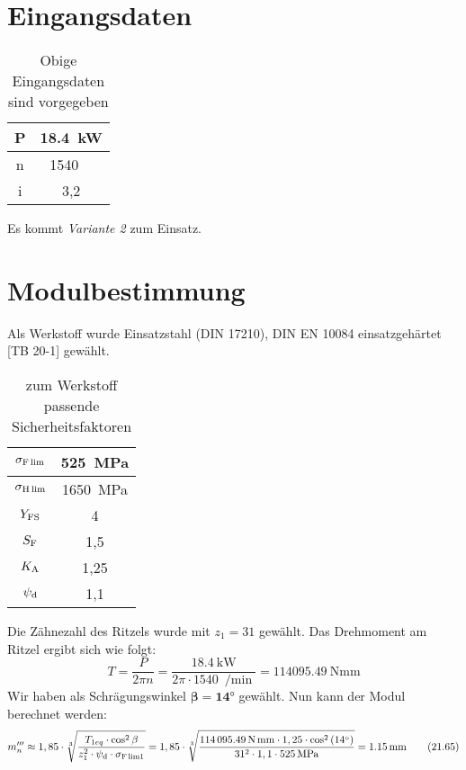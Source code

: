 \documentclass[15pt,a4paper]{article}
\begin{document}
	\tableofcontents
	\newpage
	\section{Eingangsdaten}
	\begin{table}[!hbpt]
		\centering
		\begin{tabular}{c|c}
			P & \SI{18,4}{\kilo\W}\\\hline
			n & \SI[per-mode=reciprocal]{1540}{\per \min}\\\hline
			i & 3,2
		\end{tabular}
		\caption{Obige Eingangsdaten sind vorgegeben}
		\label{Eingangsdaten}
	\end{table}
	\begin{center}
		Es kommt \textit{Variante 2} zum Einsatz.
	\end{center}
	\section{Modulbestimmung}
	Als Werkstoff wurde Einsatzstahl (DIN 17210), DIN EN 10084 einsatzgehärtet [TB 20-1] gewählt.
		\begin{table}[!hbpt]
		\centering
		\begin{tabular}{c|c}
			$\sigma_{\rm F\, lim}$ & \SI{525}{\mega\pascal}\\\hline
			$\sigma_{\rm H\, lim}$ & \SI{1650}{\mega\pascal}\\\hline
			$Y_{\rm FS}$ & 4 \\\hline
			$S_{\rm F}$ &  1,5 \\\hline
			$K_{\rm A}$ & 1,25 \\\hline
			$\psi_{\rm d}$ & 1,1
		\end{tabular}
		\caption{zum Werkstoff passende Sicherheitsfaktoren}
		\label{Sicherheit}
	\end{table}
	Die Zähnezahl des Ritzels wurde mit $z_1 = 31$ gewählt. Das Drehmoment am Ritzel ergibt sich wie folgt:
	$$T=\frac{P}{2\pi n}= \frac{\SI{18,4}{\kilo\watt}}{2\pi \cdot\SI{1540}{\per\min}}= \SI{114095,49}{\newton\milli\metre} $$
	Wir haben als Schrägungswinkel $\pmb{\beta = \ang{14}}$ gewählt.
	Nun kann der Modul berechnet werden:
	\begin{align}
			m'''_n \approx 1,85\cdot \sqrt[3]{\frac{T_{1 eq} \cdot \cos^2 \beta}{z_1^2 \cdot \psi_{\rm d}\cdot\sigma_{\rm F\, lim 1}}} =  
			1,85 \cdot \sqrt[3]{\frac{\SI{114095,49}{\newton\milli\metre}\cdot 1,25\cdot \cos^2 \left( \ang{14} \right)}{31^2\cdot1,1\cdot\SI{525}{\mega\pascal}}}=\SI{1,15}{\milli\metre} \tag{21.65}
	\end{align}
\end{document}
